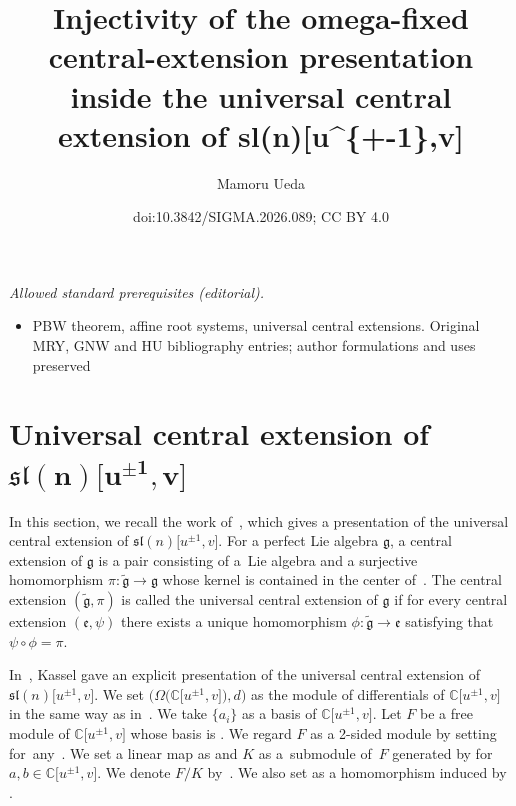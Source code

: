 \documentclass[10pt,a4paper]{amsart}
\title{Injectivity of the omega-fixed central-extension presentation inside the universal central extension of sl(n)[u\textasciicircum{}\{+-1\},v]}
\author{Mamoru Ueda}
\date{doi:10.3842/SIGMA.2026.089; CC BY 4.0}
\numberwithin{equation}{section}
\theoremstyle{definition}
\begin{document}
\maketitle
\noindent\textit{Allowed standard prerequisites (editorial).}\begin{itemize}
\item PBW theorem, affine root systems, universal central extensions. Original MRY, GNW and HU bibliography entries; author formulations and uses preserved
\end{itemize}\medskip
\section[Universal central extension of sl(n){[u\^{}\{pm1\},v]}]{Universal central extension of $\boldsymbol{\mathfrak{sl}(n)\bigl[u^{\pm1},v\bigr]}$}
In this section, we recall the work of~\cite{MRY}, which gives a presentation of the universal central extension of $\mathfrak{sl}(n)\bigl[u^{\pm1},v\bigr]$. For a perfect Lie algebra $\mathfrak{g}$, a central extension of $\mathfrak{g}$ is a pair consisting of a~Lie algebra  and a surjective homomorphism $\pi\colon\widetilde{\mathfrak{g}}\to\mathfrak{g}$ whose kernel is contained in the center of~. The central extension $(\widetilde{\mathfrak{g}},\pi)$ is called the universal central extension of $\mathfrak{g}$ if for every central extension $(\mathfrak{e},\psi)$ there exists a unique homomorphism $\phi\colon\widetilde{\mathfrak{g}}\to\mathfrak{e}$ satisfying that $\psi\circ\phi=\pi$.

In~\cite{Kassel}, Kassel gave an explicit presentation of the universal central extension of $\mathfrak{sl}(n)\bigl[u^{\pm1},v\bigr]$.
We set $\bigl(\Omega\bigl(\mathbb{C}\bigl[u^{\pm1},v\bigr]\bigr),d\bigr)$ as the module of differentials of $\mathbb{C}\bigl[u^{\pm1},v\bigr]$ in the same way as in~\cite[Section~2]{MRY}. We take $\{a_i\}$ as a basis of $\mathbb{C}\bigl[u^{\pm1},v\bigr]$. Let $F$ be a free module of $\mathbb{C}\bigl[u^{\pm1},v\bigr]$ whose basis is . We regard $F$ as a 2-sided  module by setting  for~any~. We set a linear map  as  and $K$ as a~submodule of~$F$ generated by  for $a,b\in\mathbb{C}\bigl[u^{\pm1},v\bigr]$. We denote $F/K$ by~. We also set  as a homomorphism induced by .
\end{document}
